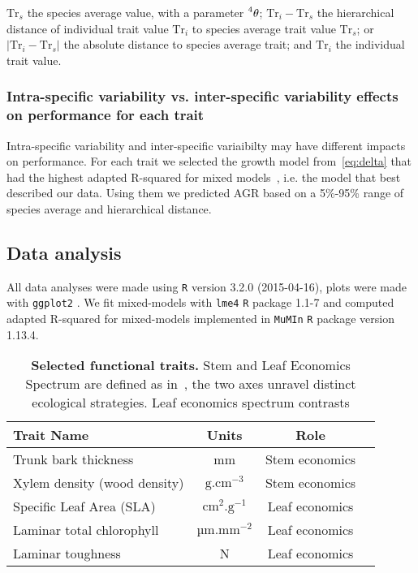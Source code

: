  $\text{Tr}_s$ the species average value, with a parameter $\prescript{4}{}\theta$; $\text{Tr}_i - \text{Tr}_s$ the hierarchical distance of individual trait value $\text{Tr}_i$ to species average trait value $\text{Tr}_s$; or $\vert \text{Tr}_i - \text{Tr}_s \vert$ the absolute distance to species average trait; and $\text{Tr}_i$ the individual trait value.

\subsubsection*{Intra-specific variability vs. inter-specific variability effects on performance for each trait}

Intra-specific variability and inter-specific variaibilty may have different impacts on performance. For each trait we selected the growth model from~\autoref{eq:delta} that had the highest adapted R-squared for mixed models~\citep{nakagawa_general_2013}, i.e. the model that best described our data. Using them we predicted AGR based on a 5\%-95\% range of species average and hierarchical distance.

\subsection*{Data analysis}

All data analyses were made using \texttt{R} \citep{R_language} version 3.2.0 (2015-04-16), plots were made with \texttt{ggplot2} \citep{ggplot2_pkg}. We fit mixed-models with \texttt{lme4} \texttt{R} package \citep{lme4_pkg} 1.1-7 and computed adapted R-squared for mixed-models \citep{nakagawa_general_2013} implemented in \texttt{MuMIn} \texttt{R} package \citep{mumin_pkg} version 1.13.4.

\begin{table}
	\begin{center}
		\begin{tabular}{lccc}
		\hline
		Trait Name & Units & Role \\
		\hline
		Trunk bark thickness & mm & Stem economics \\
		Xylem density (wood density) & $\text{g}.\text{cm}^{-3}$ & Stem economics \\
		Specific Leaf Area (SLA) & $\text{cm}^2.\text{g}^{-1}$ & Leaf economics \\
		Laminar total chlorophyll & $\text{µm}.\text{mm}^{-2}$  & Leaf economics \\
		Laminar toughness & N & Leaf economics \\
		\hline
		\end{tabular}
		\caption{\textbf{Selected functional traits.} Stem and Leaf Economics Spectrum are defined as in~\citep{baraloto_decoupled_2010}, the two axes unravel distinct ecological strategies. Leaf economics spectrum contrasts} 
		\label{tab:seltraits}
	\end{center}
\end{table}
